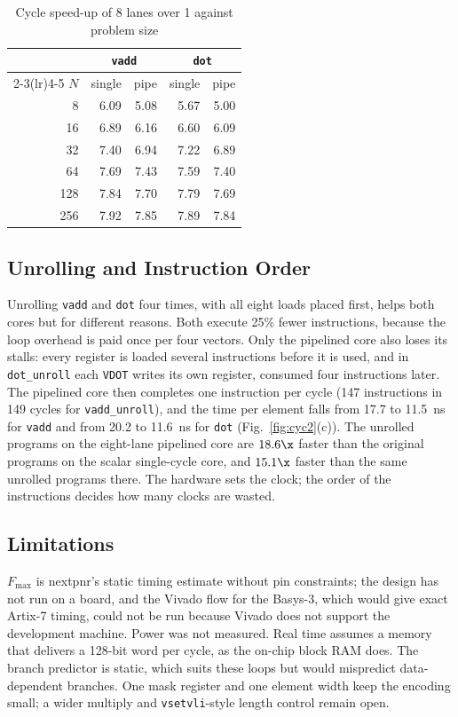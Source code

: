 \begin{table}[t]
\centering
\caption{Cycle speed-up of 8 lanes over 1 against problem size}
\label{tab:size}
\footnotesize
\begin{tabular}{@{}rrrrr@{}}
\toprule
 & \multicolumn{2}{c}{\texttt{vadd}} & \multicolumn{2}{c}{\texttt{dot}} \\
\cmidrule(lr){2-3}\cmidrule(lr){4-5}
$N$ & single & pipe & single & pipe \\
\midrule
8   & 6.09 & 5.08 & 5.67 & 5.00 \\
16  & 6.89 & 6.16 & 6.60 & 6.09 \\
32  & 7.40 & 6.94 & 7.22 & 6.89 \\
64  & 7.69 & 7.43 & 7.59 & 7.40 \\
128 & 7.84 & 7.70 & 7.79 & 7.69 \\
256 & 7.92 & 7.85 & 7.89 & 7.84 \\
\bottomrule
\end{tabular}
\end{table}

\subsection{Unrolling and Instruction Order}
Unrolling \texttt{vadd} and \texttt{dot} four times, with all eight loads placed first,
helps both cores but for different reasons. Both execute 25\% fewer instructions,
because the loop overhead is paid once per four vectors. Only the pipelined core also
loses its stalls: every register is loaded several instructions before it is used, and
in \texttt{dot\_unroll} each \texttt{VDOT} writes its own register, consumed four
instructions later. The pipelined core then completes one instruction per cycle
(147 instructions in 149 cycles for \texttt{vadd\_unroll}), and the time per element
falls from 17.7 to 11.5~ns for \texttt{vadd} and from 20.2 to 11.6~ns for \texttt{dot}
(Fig.~\ref{fig:cyc2}(c)). The unrolled programs on the eight-lane pipelined core are
$18.6\x$ faster than the original programs on the scalar single-cycle core, and
$15.1\x$ faster than the same unrolled programs there. The hardware
sets the clock; the order of the instructions decides how many clocks are wasted.

\subsection{Limitations}
$F_{\max}$ is nextpnr's static timing estimate without pin constraints; the design has
not run on a board, and the Vivado flow for the Basys-3, which would give exact Artix-7
timing, could not be run because Vivado does not support the development machine. Power
was not measured. Real time assumes a memory that delivers a 128-bit word per cycle, as
the on-chip block RAM does. The branch predictor is static, which suits these loops but
would mispredict data-dependent branches. One mask register and one element width keep
the encoding small; a wider multiply and \texttt{vsetvli}-style length control remain
open.

